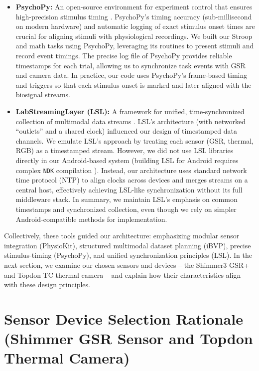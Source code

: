 \documentclass{report}
\begin{document}
\begin{itemize}
        \item \textbf{PsychoPy:} An open-source environment for experiment control that ensures high-precision stimulus timing \cite{psychopy}. PsychoPy's timing accuracy (sub-millisecond on modern hardware) and automatic logging of exact stimulus onset times \cite{psychopy} are crucial for aligning stimuli with physiological recordings. We built our Stroop and math tasks using PsychoPy, leveraging its routines to present stimuli and record event timings. The precise log file of PsychoPy provides reliable timestamps for each trial, allowing us to synchronize task events with GSR and camera data. In practice, our code uses PsychoPy's frame-based timing and triggers so that each stimulus onset is marked and later aligned with the biosignal streams.

        \item \textbf{LabStreamingLayer (LSL):} A framework for unified, time-synchronized collection of multimodal data streams \cite{lsl}. LSL's architecture (with networked ``outlets'' and a shared clock) influenced our design of timestamped data channels. We emulate LSL's approach by treating each sensor (GSR, thermal, RGB) as a timestamped stream. However, we did not use LSL libraries directly in our Android-based system (building LSL for Android requires complex \texttt{NDK} compilation \cite{lsl}). Instead, our architecture uses standard network time protocol (NTP) to align clocks across devices and merges streams on a central host, effectively achieving LSL-like synchronization without its full middleware stack. In summary, we maintain LSL's emphasis on common timestamps and synchronized collection, even though we rely on simpler Android-compatible methods for implementation.
    \end{itemize}

    Collectively, these tools guided our architecture: emphasizing modular sensor integration (PhysioKit), structured multimodal dataset planning (iBVP), precise stimulus-timing (PsychoPy), and unified synchronization principles (LSL). In the next section, we examine our chosen sensors and devices -- the Shimmer3 GSR+ and Topdon TC thermal camera -- and explain how their characteristics align with these design principles.


    \section{Sensor Device Selection Rationale (Shimmer GSR Sensor and Topdon Thermal Camera)}
    \label{sec:sensor_selection}
\end{document}
